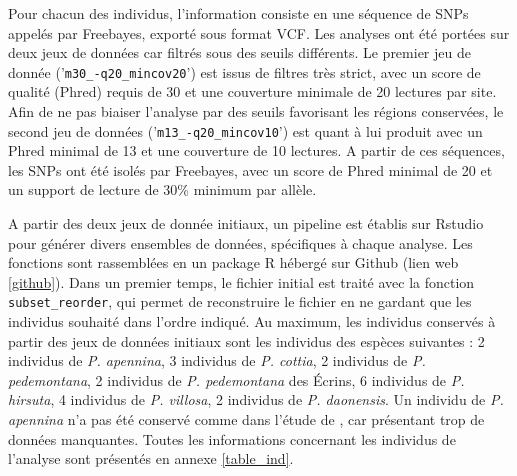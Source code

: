 Pour chacun des individus, l'information consiste en une séquence de SNPs appelés par Freebayes, exporté sous format VCF.
 Les analyses ont été portées sur deux jeux de données car filtrés sous des seuils différents.
 Le premier jeu de donnée ('\verb|m30_-q20_mincov20|') est issus de filtres très strict, avec un score de qualité (Phred) requis de 30 et une couverture minimale de 20 lectures par site.
 Afin de ne pas biaiser l'analyse par des seuils favorisant les régions conservées, le second jeu de données ('\verb|m13_-q20_mincov10|') est quant à lui produit avec un Phred minimal de 13 et une couverture de 10 lectures.
 A partir de ces séquences, les SNPs ont été isolés par Freebayes, avec un score de Phred minimal de 20 et un support de lecture de 30\% minimum par allèle.

A partir des deux jeux de donnée initiaux, un pipeline est établis sur Rstudio \citep{RTeam2017} pour générer divers ensembles de données, spécifiques à chaque analyse.
 Les fonctions sont rassemblées en un package R hébergé sur Github (lien web \ref{github}).
 Dans un premier temps, le fichier initial est traité avec la fonction \verb|subset_reorder|, qui permet de reconstruire le fichier en ne gardant que les individus souhaité dans l'ordre indiqué.
 Au maximum, les individus conservés à partir des jeux de données initiaux sont les individus des espèces suivantes :
2 individus de \textit{P. apennina}, 
3 individus de \textit{P. cottia}, 
2 individus de \textit{P. pedemontana}, 
2 individus de \textit{P. pedemontana} des Écrins, 
6 individus de \textit{P. hirsuta}, 
4 individus de \textit{P. villosa}, 
2 individus de \textit{P. daonensis}.
Un individu de \textit{P. apennina} n'a pas été conservé comme dans l'étude de \citet{Boucher2016a}, car présentant trop de données manquantes.
 Toutes les informations concernant les individus de l'analyse sont présentés en annexe \ref{table_ind}.


